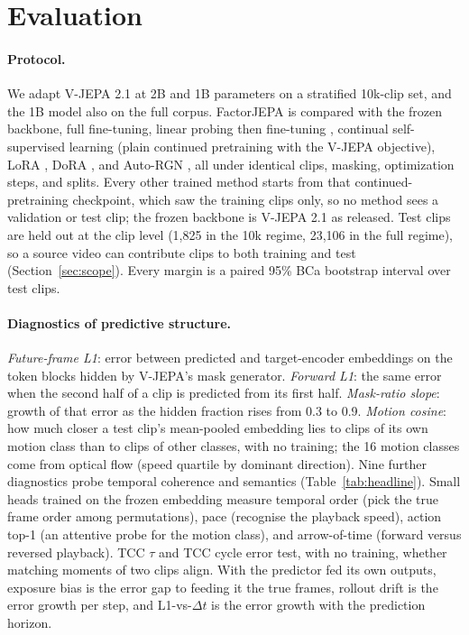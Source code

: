 \section{Evaluation}

\paragraph{Protocol.}
We adapt V-JEPA 2.1 at 2B and 1B parameters on a stratified 10k-clip set, and the 1B model also on the full corpus. FactorJEPA is compared with the frozen backbone, full fine-tuning, linear probing then fine-tuning \cite{kumar2022finetuning}, continual self-supervised learning (plain continued pretraining with the V-JEPA objective), LoRA \cite{hu2022lora}, DoRA \cite{liu2024dora}, and Auto-RGN \cite{lee2023surgical}, all under identical clips, masking, optimization steps, and splits. Every other trained method starts from that continued-pretraining checkpoint, which saw the training clips only, so no method sees a validation or test clip; the frozen backbone is V-JEPA 2.1 as released. Test clips are held out at the clip level (1,825 in the 10k regime, 23,106 in the full regime), so a source video can contribute clips to both training and test (Section~\ref{sec:scope}). Every margin is a paired 95\% BCa bootstrap interval over test clips.

\paragraph{Diagnostics of predictive structure.}
\emph{Future-frame L1}: error between predicted and target-encoder embeddings on the token blocks hidden by V-JEPA's mask generator. \emph{Forward L1}: the same error when the second half of a clip is predicted from its first half. \emph{Mask-ratio slope}: growth of that error as the hidden fraction rises from 0.3 to 0.9. \emph{Motion cosine}: how much closer a test clip's mean-pooled embedding lies to clips of its own motion class than to clips of other classes, with no training; the 16 motion classes come from optical flow (speed quartile by dominant direction). Nine further diagnostics probe temporal coherence and semantics (Table~\ref{tab:headline}). Small heads trained on the frozen embedding measure temporal order (pick the true frame order among permutations), pace (recognise the playback speed), action top-1 (an attentive probe for the motion class), and arrow-of-time (forward versus reversed playback). TCC $\tau$ and TCC cycle error test, with no training, whether matching moments of two clips align. With the predictor fed its own outputs, exposure bias is the error gap to feeding it the true frames, rollout drift is the error growth per step, and L1-vs-$\Delta t$ is the error growth with the prediction horizon.

